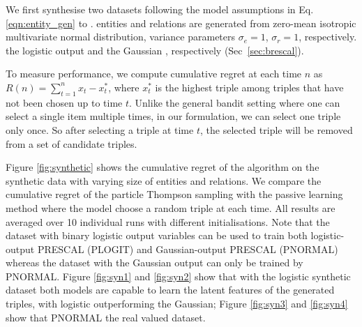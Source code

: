 We first synthesise two datasets 
following the model assumptions in Eq. \ref{eqn:entity_gen} to 
\verify{\ref{eqn:triple_gen}}. 
entities and relations are generated from zero-mean isotropic multivariate normal distribution,  
variance parameters $\sigma_e=1$, $\sigma_r=1$, respectively.
 the logistic output and the Gaussian , respectively (Sec~\ref{sec:brescal}). 

To measure performance, we compute cumulative regret 
at each time $n$ as $R(n) = \sum_{t=1}^{n} x_t - x^{*}_t$, 
where $x^*_t$ is the highest triple among triples that have not been chosen up to time $t$. Unlike the general 
bandit setting where one can select a single item multiple times, in our formulation, we can select one triple 
only once. So after selecting a triple at time $t$, the selected triple will be removed from a set of candidate 
triples.

Figure \ref{fig:synthetic} shows the cumulative regret of the algorithm on the synthetic data with varying size of 
entities and relations. We compare the cumulative regret of the particle Thompson sampling with the passive 
learning method where the model choose a random triple at each time. All results are averaged over 10 
individual runs with different initialisations. 
Note that the dataset with binary logistic output variables can be used to train both logistic-output PRESCAL (PLOGIT) and Gaussian-output PRESCAL (PNORMAL) whereas the dataset with the Gaussian output can only be trained by PNORMAL.
Figure \ref{fig:syn1} and \ref{fig:syn2} show that with the logistic synthetic dataset both models are capable to learn the latent features of the generated triples, with logistic outperforming the Gaussian; Figure \ref{fig:syn3} and \ref{fig:syn4} show that PNORMAL  the real valued dataset. 


